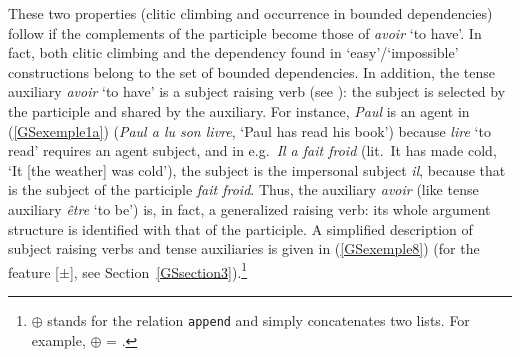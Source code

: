 	\label{GSexemple7c}
\zl

\largerpage[2]
\noindent
These two properties (clitic climbing and occurrence in bounded dependencies) follow if the complements of the participle become those of \emph{avoir} `to have'.
In fact, both clitic climbing and the dependency found in `easy'/`impossible' constructions belong to the set of bounded dependencies.
In addition, the tense auxiliary \emph{avoir} `to have' is a subject raising verb (see ): the subject is selected by the participle and shared by the auxiliary. For instance, \emph{Paul} is an agent in (\ref{GSexemple1a}) (\emph{Paul a lu son livre}, `Paul has read his book') because \emph{lire} `to read' requires an agent subject, and in e.g.\ \emph{Il a fait froid} (lit.\ It has made cold, `It [the weather] was cold'), the subject is the impersonal subject \emph{il}, because that is the subject of the participle \emph{fait froid}.
Thus, the auxiliary \emph{avoir} (like tense auxiliary \emph{\^etre} `to be') is, in fact, a
generalized raising verb: its whole argument structure is identified with that of the participle. A
simplified description of subject raising verbs and tense auxiliaries is given in (\ref{GSexemple8})
(for the feature [\light{}$\pm$], see Section~\ref{GSsection3}).\footnote{
  $\oplus$ stands for the relation \texttt{append} and simply concatenates two lists. For
    example,  $\oplus$  = .
}

\begin{exe}
	\ex 	\label{GSexemple8}
	\begin{xlist}
	
	\end{xlist}
\end{exe}

